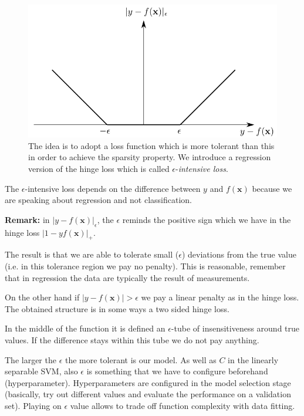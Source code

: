 \begin{figure}[H]
	\centering
	\includegraphics[scale=0.5]{
        images/14_NonLinearSVMs_insensitiveLoss.png
    }
	\caption{The idea is to adopt a loss function which is more tolerant than this
	in order to achieve the sparsity property. We introduce a regression version of
	the hinge loss which is called $\epsilon$-\textit{intensive loss}.}
	\label{fig:insensitive_loss}
\end{figure}

The $\epsilon$-intensive loss depends on the difference between $y$ and
$f(\pmb{x})$ because we are speaking about regression and not classification.
\newline

\textbf{Remark:} in $|y - f(\pmb{x})|_{\epsilon}$, the $\epsilon$ reminds the
positive sign which we have in the hinge loss $|1 - yf(\pmb{x})|_{+}$.
\newline

The result is that we are able to tolerate small ($\epsilon$) deviations from
the true value (i.e. in this tolerance region we pay no penalty). This is
reasonable, remember that in regression the data are typically the result of measurements.
\newline

On the other hand if $|y-f(\pmb{x})|>\epsilon$ we pay a linear penalty as in the
hinge loss. The obtained structure is in some ways a two sided hinge loss.
\newline

In the middle of the function it is defined an $\epsilon$-tube of
insensitiveness around true values. If the difference stays within this tube we do
not pay anything.
\newline

The larger the $\epsilon$ the more tolerant is our model. As well as $C$ in the
linearly separable SVM, also $\epsilon$ is something that we have to configure beforehand
(hyperparameter). Hyperparameters are configured in the model selection stage (basically,
try out different values and evaluate the performance on a validation set).
Playing on $\epsilon$ value allows to trade off function complexity with data
fitting.

